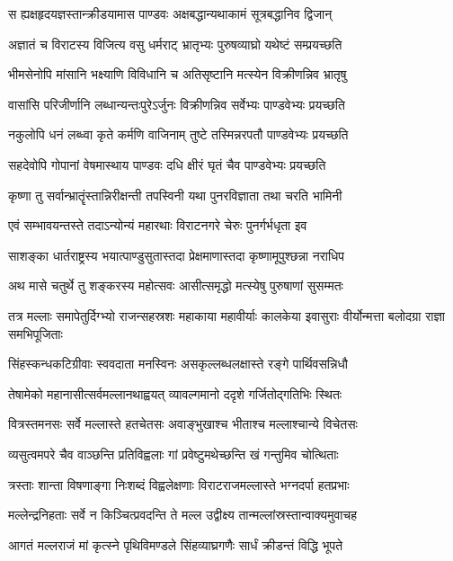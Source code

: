 \twolineshloka
{स ह्यक्षहृदयज्ञस्तान्क्रीडयामास पाण्डवः}
{अक्षबद्धान्यथाकामं सूत्रबद्धानिव द्विजान्}


\twolineshloka
{अज्ञातं च विराटस्य विजित्य वसु धर्मराट्}
{भ्रातृभ्यः पुरुषव्याघ्रो यथेष्टं सम्प्रयच्छति}


\twolineshloka
{भीमसेनोपि मांसानि भक्ष्याणि विविधानि च}
{अतिसृष्टानि मत्स्येन विक्रीणन्निव भ्रातृषु}


\twolineshloka
{वासांसि परिजीर्णानि लब्धान्यन्तःपुरेऽर्जुनः}
{विक्रीणन्निव सर्वेभ्यः पाण्डवेभ्यः प्रयच्छति}


\twolineshloka
{नकुलोपि धनं लब्ध्वा कृते कर्मणि वाजिनाम्}
{तुष्टे तस्मिन्नरपतौ पाण्डवेभ्यः प्रयच्छति}


\twolineshloka
{सहदेवोपि गोपानां वेषमास्थाय पाण्डवः}
{दधि क्षीरं घृतं चैव पाण्डवेभ्यः प्रयच्छति}


\twolineshloka
{कृष्णा तु सर्वान्भ्रातॄंस्तान्निरीक्षन्ती तपस्विनी}
{यथा पुनरविज्ञाता तथा चरति भामिनी}


\twolineshloka
{एवं सम्भावयन्तस्ते तदाऽन्योन्यं महारथाः}
{विराटनगरे चेरुः पुनर्गर्भधृता इव}


\twolineshloka
{साशङ्का धार्तराष्ट्रस्य भयात्पाण्डुसुतास्तदा}
{प्रेक्षमाणास्तदा कृष्णामूपुश्छन्ना नराधिप}


\twolineshloka
{अथ मासे चतुर्थे तु शङ्करस्य महोत्सवः}
{आसीत्समृद्धो मत्स्येषु पुरुषाणां सुसम्मतः}


\onelineshloka
{तत्र मल्लाः समापेतुर्दिग्भ्यो राजन्सहस्रशः}
\twolineshloka
{महाकाया महावीर्याः कालकेया इवासुराः}
{वीर्योन्मत्ता बलोदग्रा राज्ञा समभिपूजिताः}


\twolineshloka
{सिंहस्कन्धकटिग्रीवाः स्ववदाता मनस्विनः}
{असकृल्लब्धलक्षास्ते रङ्गे पार्थिवसन्निधौ}


\twolineshloka
{तेषामेको महानासीत्सर्वमल्लानथाह्वयत्}
{व्यावल्गमानो ददृशे गर्जितोद्गतिभिः स्थितः}


\twolineshloka
{वित्रस्तमनसः सर्वे मल्लास्ते हतचेतसः}
{अवाङ्भुखाश्च भीताश्च मल्लाश्चान्ये विचेतसः}


\twolineshloka
{व्यसुत्वमपरे चैव वाञ्छन्ति प्रतिविह्वलाः}
{गां प्रवेष्टुमथेच्छन्ति खं गन्तुमिव चोत्थिताः}


\twolineshloka
{त्रस्ताः शान्ता विषणाङ्गा निःशब्दं विह्वलेक्षणाः}
{विराटराजमल्लास्ते भग्नदर्पा हतप्रभाः}


\twolineshloka
{मल्लेन्द्रनिहताः सर्वे न किञ्चित्प्रवदन्ति ते}
{मल्ल उद्वीक्ष्य तान्मल्लांस्रस्तान्वाक्यमुवाचह}


\twolineshloka
{आगतं मल्लराजं मां कृत्स्ने पृथिविमण्डले}
{सिंहव्याघ्रगणैः सार्धं क्रीडन्तं विद्धि भूपते}


